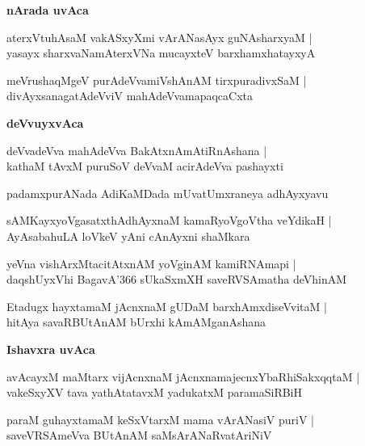 \documentclass[twoside,12pt,openright]{book}
\newcounter{shloka}[chapter]
\def\uvaca#1{\centerline{{\large\textbf{#1}}}}
\begin{document}
\uvaca{ nArada uvAca }

\begin{shloka}
aterxVtuhAsaM vakASxyXmi vArANasAyx guNAsharxyaM |\\
yasayx sharxvaNamAterxVNa mucayxteV barxhamxhatayxyA 
\end{shloka}

\begin{shloka}
meVrushaqMgeV purAdeVvamiVshAnAM tirxpuradivxSaM |\\
divAyxsanagatAdeVviV mahAdeVvamapaqcaCxta
\end{shloka}

\uvaca{ deVvuyxvAca } 

\begin{shloka}
deVvadeVva mahAdeVva BakAtxnAmAtiRnAshana |\\
kathaM tAvxM puruSoV deVvaM acirAdeVva pashayxti 
\end{shloka}

\begin{center}
padamxpurANada AdiKaMDada mUvatUmxraneya adhAyxyavu
\end{center}

\begin{shloka}
sAMKayxyoVgasatxthAdhAyxnaM kamaRyoVgoVtha veYdikaH |\\
AyAsabahuLA loVkeV yAni cAnAyxni shaMkara
\end{shloka}

\begin{shloka}
yeVna vishArxMtacitAtxnAM yoVginAM kamiRNAmapi |\\
daqshUyxVhi BagavA\char'366 sUkaSxmXH saveRVSAmatha deVhinAM 
\end{shloka}

\begin{shloka}
Etadugx hayxtamaM jAcnxnaM gUDaM barxhAmxdiseVvitaM |\\
hitAya savaRBUtAnAM bUrxhi kAmAMganAshana
\end{shloka}

\uvaca{ Ishavxra uvAca }

\begin{shloka}
avAcayxM maMtarx vijAcnxnaM jAcnxnamajecnxYbaRhiSakxqqtaM |\\
vakeSxyXV tava yathAtatavxM yadukatxM paramaSiRBiH 
\end{shloka}

\begin{shloka}
paraM guhayxtamaM keSxVtarxM mama vArANasiV puriV |\\
saveVRSAmeVva BUtAnAM saMsArANaRvatAriNiV 
\end{shloka}
\end{document}
